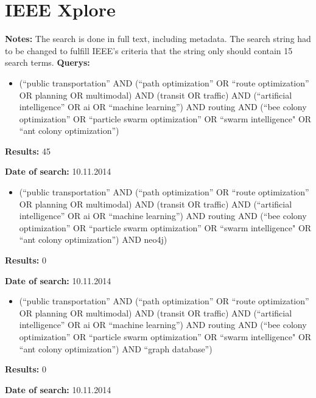 \section{IEEE Xplore}
\par \textbf{Notes:} The search is done in full text, including metadata. The search string had to be changed to fulfill IEEE's criteria that the string only should contain 15 search terms. 
\newline
\newline 
\textbf{Querys:}
\begin{itemize}
	\item(``public transportation'' AND (``path optimization'' OR ``route optimization'' OR planning OR multimodal) AND (transit OR traffic) AND (``artificial intelligence'' OR ai OR ``machine learning'') AND routing AND (``bee colony optimization'' OR ``particle swarm optimization'' OR ``swarm intelligence" OR ``ant colony optimization'')
\end{itemize}
\par \textbf{Results:} 45
\par \textbf{Date of search:} 10.11.2014
\begin{itemize}
	\item(``public transportation'' AND (``path optimization'' OR ``route optimization'' OR planning OR multimodal) AND (transit OR traffic) AND (``artificial intelligence'' OR ai OR ``machine learning'') AND routing AND (``bee colony optimization'' OR ``particle swarm optimization'' OR ``swarm intelligence" OR ``ant colony optimization'') AND neo4j)
\end{itemize}
\par \textbf{Results:} 0
\par \textbf{Date of search:} 10.11.2014
\begin{itemize}
		\item(``public transportation'' AND (``path optimization'' OR ``route optimization'' OR planning OR multimodal) AND (transit OR traffic) AND (``artificial intelligence'' OR ai OR ``machine learning'') AND routing AND (``bee colony optimization'' OR ``particle swarm optimization'' OR ``swarm intelligence" OR ``ant colony optimization'') AND ``graph database'')
\end{itemize}
\par \textbf{Results:} 0
\par \textbf{Date of search:} 10.11.2014


